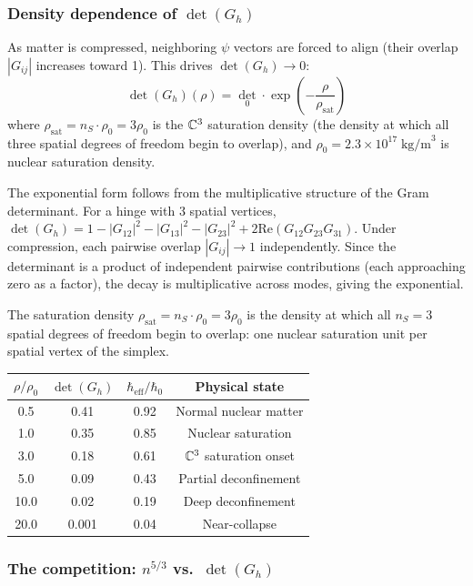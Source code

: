 \subsubsection{Density dependence of $\det(G_h)$}

As matter is compressed, neighboring $\psi$ vectors are forced to align (their overlap $|G_{ij}|$ increases toward 1). This drives $\det(G_h) \to 0$:
\begin{equation}
\det(G_h)(\rho) = \det_0 \cdot \exp\!\left(-\frac{\rho}{\rho_\text{sat}}\right)
\label{eq:det_rho}
\end{equation}
where $\rho_\text{sat} = n_S \cdot \rho_0 = 3\rho_0$ is the $\mathbb{C}^3$ saturation density (the density at which all three spatial degrees of freedom begin to overlap), and $\rho_0 = 2.3 \times 10^{17}\;\text{kg/m}^3$ is nuclear saturation density.

The exponential form follows from the multiplicative structure of the Gram determinant. For a hinge with 3 spatial vertices, $\det(G_h) = 1 - |G_{12}|^2 - |G_{13}|^2 - |G_{23}|^2 + 2\text{Re}(G_{12}G_{23}G_{31})$. Under compression, each pairwise overlap $|G_{ij}| \to 1$ independently. Since the determinant is a product of independent pairwise contributions (each approaching zero as a factor), the decay is multiplicative across modes, giving the exponential.

The saturation density $\rho_\text{sat} = n_S \cdot \rho_0 = 3\rho_0$ is the density at which all $n_S = 3$ spatial degrees of freedom begin to overlap: one nuclear saturation unit per spatial vertex of the simplex.

\begin{center}
\begin{tabular}{cccc}
\hline
$\rho/\rho_0$ & $\det(G_h)$ & $\hbar_\text{eff}/\hbar_0$ & Physical state \\
\hline
0.5 & 0.41 & 0.92 & Normal nuclear matter \\
1.0 & 0.35 & 0.85 & Nuclear saturation \\
3.0 & 0.18 & 0.61 & $\mathbb{C}^3$ saturation onset \\
5.0 & 0.09 & 0.43 & Partial deconfinement \\
10.0 & 0.02 & 0.19 & Deep deconfinement \\
20.0 & 0.001 & 0.04 & Near-collapse \\
\hline
\end{tabular}
\end{center}

\subsubsection{The competition: $n^{5/3}$ vs.\ $\det(G_h)$}

